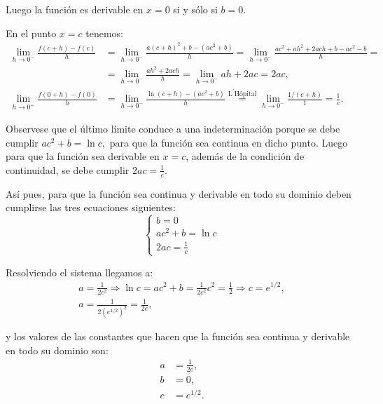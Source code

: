 {Luego la función es derivable en $x=0$ si y sólo si $b=0$.

En el punto $x=c$ tenemos: 
\begin{align*}
\lim_{h\rightarrow 0^{-}}\frac{f(c+h)-f(c)}{h} &= \lim_{h\rightarrow 0^{-}}\frac{a(c+h)^2+b-(ac^2+b)}{h} = \lim_{h\rightarrow 0^{-}}\frac{ac^2+ah^2+2ach+b-ac^2-b}{h}= \\
&= \lim_{h\rightarrow 0^{-}}\frac{ah^2+2ach}{h} = \lim_{h\rightarrow 0^{-}}ah+2ac=2ac, \\
\lim_{h\rightarrow 0^{+}}\frac{f(0+h)-f(0)}{h} &= \lim_{h\rightarrow 0^{-}}\frac{\ln (c+h)-(ac^2+b)}{h}\stackrel{\text{L}^{\prime }\text{H\^{o}pital}}{=} \lim_{h\rightarrow 0^{-}}\frac{1/(c+h)}{1} = \frac{1}{c}.
\end{align*}

Observese que el último límite conduce a una indeterminación porque se debe cumplir $ac^2+b=\ln c,$ para que la función sea continua en dicho punto. Luego para que la función sea derivable en $x=c$, además de la condición de continuidad, se debe cumplir $2ac = \frac{1}{c}$.

Así pues, para que la función sea continua y derivable en todo su dominio deben cumplirse las tres ecuaciones siguientes: 
\[
\begin{cases}
b=0 \\ 
ac^2+b = \ln c\\
2ac = \frac 1c
\end{cases}
\]

Resolviendo el sistema llegamos a: 
\[
\renewcommand{\arraystretch}{2.5}
\begin{array}{c}
\displaystyle
a = \frac{1}{2c^2} \Longrightarrow \ln c = ac^2+b = \frac{1}{2c^2}c^2 = \frac{1}{2} \Longrightarrow c = e^{1/2}, \\ 
\displaystyle a = \frac{1}{2(e^{1/2})^2} = \frac{1}{2e},
\end{array}
\]

y los valores de las constantes que hacen que la función sea continua y derivable en todo su dominio son: 
\begin{align*}
a &= \frac{1}{2e},\\
b &= 0, \\
c &= e^{1/2}.
\end{align*}
}


